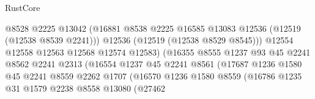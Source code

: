 \begin{lexlean}{RustCore}
\begin{coremodule}
                                          @8528
                                          @2225
                                          @13042
                                          (@16881
                                            @8538
                                            @2225
                                            @16585
                                            @13083
                                            @12536
                                            (@12519 (@12538 @8539 @2241)))
                                          @12536
                                          (@12519 (@12538 @8529 @8545)))
                                        @12554
                                        @12558
                                        @12563
                                        @12568
                                        @12574
                                        @12583)
                                      (@16355
                                        @8555
                                        @1237
                                        @93
                                        @45
                                        @2241
                                        @8562
                                        @2241
                                        @2313
                                        (@16554
                                          @1237
                                          @45
                                          @2241
                                          @8561
                                          (@17687
                                            @1236
                                            @1580
                                            @45
                                            @2241
                                            @8559
                                            @2262
                                            @1707
                                            (@16570
                                              @1236
                                              @1580
                                              @8559
                                              (@16786
                                                @1235
                                                @31
                                                @1579
                                                @2238
                                                @8558
                                                @13080
                                                (@27462

\end{coremodule}
\end{lexlean}
